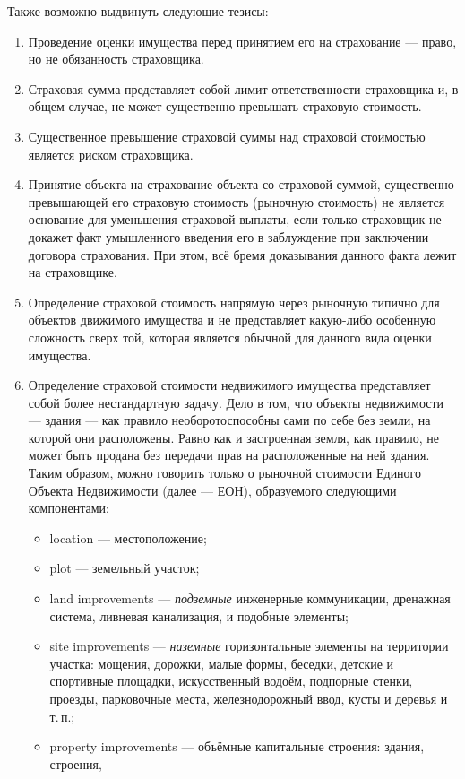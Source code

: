 \documentclass[12pt]{scrartcl}
\begin{document}
Также возможно выдвинуть следующие тезисы:
\begin{enumerate}
    \item Проведение оценки имущества перед принятием его на страхование --- право, но не обязанность страховщика.
    \item Страховая сумма представляет собой лимит ответственности страховщика и, в общем случае, не может существенно превышать страховую стоимость.
    \item Существенное превышение страховой суммы над страховой стоимостью является риском страховщика.
    \item Принятие объекта на страхование объекта со страховой суммой, существенно превышающей его страховую стоимость (рыночную стоимость) не является основание для уменьшения страховой выплаты, если только страховщик не докажет факт умышленного введения его в заблуждение при заключении договора страхования. При этом, всё бремя доказывания данного факта лежит на страховщике.
    \item Определение страховой стоимость напрямую через рыночную типично для объектов движимого имущества и не представляет какую-либо особенную сложность сверх той, которая является обычной для данного вида оценки имущества.
    \item Определение страховой стоимости недвижимого имущества представляет собой более нестандартную задачу. Дело в том, что объекты недвижимости --- здания --- как правило необоротоспособны сами по себе без земли, на которой они расположены. Равно как и застроенная земля, как правило, не может быть продана без передачи прав на расположенные на ней здания. Таким образом, можно говорить только о рыночной стоимости Единого Объекта Недвижимости (далее --- ЕОН), образуемого следующими компонентами:
    \begin{itemize}
        \item location --- местоположение;
        \item plot --- земельный участок;
        \item land improvements --- \emph{подземные} инженерные коммуникации, дренажная система, ливневая канализация, и подобные элементы;
        \item site improvements --- \emph{наземные} горизонтальные элементы на территории участка: мощения, дорожки, малые формы, беседки, детские и спортивные площадки, искусственный водоём, подпорные стенки, проезды, парковочные места, железнодорожный ввод, кусты и деревья и т.\,п.;
        \item property improvements --- объёмные капитальные строения: здания, строения,

\end{itemize}
\end{enumerate}
\end{document}

